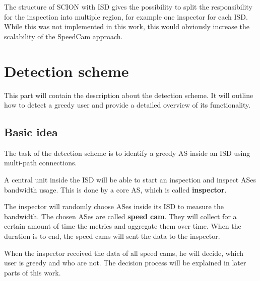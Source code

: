 \documentclass[thesis.tex]{subfiles}
\begin{document}
The structure of SCION with ISD gives the possibility to split the responsibility for the inspection into multiple region, for example one inspector for each ISD. While this was not implemented in this work, this would obviously increase the scalability of the SpeedCam approach.

\section{Detection scheme}
This part will contain the description about the detection scheme. It will outline how to detect a greedy user and provide a detailed overview of its functionality.

\subsection{Basic idea}
The task of the detection scheme is to identify a greedy AS inside an ISD using multi-path connections. 

A central unit inside the ISD will be able to start an inspection and inspect ASes bandwidth usage. This is done by a core AS, which is called \textbf{inspector}. 

The inspector will randomly choose ASes inside its ISD to measure the bandwidth. The chosen ASes are called \textbf{speed cam}. They will collect for a certain amount of time the metrics and aggregate them over time. When the duration is to end, the speed cams will sent the data to the inspector.

When the inspector received the data of all speed cams, he will decide, which user is greedy and who are not. The decision process will be explained in later parts of this work.
\end{document}
